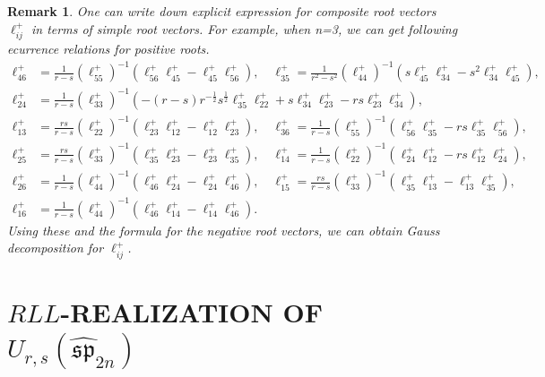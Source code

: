 \documentclass[10pt,a4paper]{amsart}
\newtheorem{remark}[theorem]{Remark}
\numberwithin{equation}{section}
\begin{document}
  \begin{remark} One can write down explicit expression for composite root vectors $\ell_{i j}^{+}$ in terms of simple root vectors.
  For example, when n=3, we can get  following ecurrence relations for positive roots.
\begin{align*}
\ell_{46}^{+}&=\frac{1}{r-s}\left(\ell_{55}^{+}\right)^{-1}\left(\ell_{56}^{+} \ell_{45}^{+}-\ell_{45}^{+} \ell_{56}^{+}\right), \quad \ell_{35}^{+}=\frac{1}{r^2-s^2}\left(\ell_{44}^{+}\right)^{-1}\left(s \ell_{45}^{+} \ell_{34}^{+}-s^2 \ell_{34}^{+} \ell_{45}^{+}\right),\\
\ell_{24}^{+}&=\frac{1}{r-s}\left(\ell_{33}^{+}\right)^{-1}\left(-(r-s) r^{-\frac{1}{2}} s^{\frac{1}{2}} \ell_{35}^{+} \ell_{22}^{+}+s \ell_{34}^{+} \ell_{23}^{+}-r s \ell_{23}^{+} \ell_{34}^{+}\right), \\
\ell_{13}^{+}&=\frac{r s}{r-s}\left(\ell_{22}^{+}\right)^{-1}\left(\ell_{23}^{+} \ell_{12}^{+}-\ell_{12}^{+} \ell_{23}^{+}\right), \quad \ell_{36}^{+}=\frac{1}{r-s}\left(\ell_{55}^{+}\right)^{-1}\left(\ell_{56}^{+} \ell_{35}^{+}-r s \ell_{35}^{+} \ell_{56}^{+}\right),\\
\ell_{25}^{+}&=\frac{r s}{r-s}\left(\ell_{33}^{+}\right)^{-1}\left(\ell_{35}^{+} \ell_{23}^{+}-\ell_{23}^{+} \ell_{35}^{+}\right), \quad \ell_{14}^{+}=\frac{1}{r-s}\left(\ell_{22}^{+}\right)^{-1}\left(\ell_{24}^{+} \ell_{12}^{+}-r s \ell_{12}^{+} \ell_{24}^{+}\right),\\
\ell_{26}^{+}&=\frac{1}{r-s}\left(\ell_{44}^{+}\right)^{-1}\left(\ell_{46}^{+} \ell_{24}^{+}-\ell_{24}^{+} \ell_{46}^{+}\right), \quad \ell_{15}^{+}=\frac{r s}{r-s}\left(\ell_{33}^{+}\right)^{-1}\left(\ell_{35}^{+} \ell_{13}^{+}-\ell_{13}^{+} \ell_{35}^{+}\right),\\
\ell_{16}^{+}&=\frac{1}{r-s}\left(\ell_{44}^{+}\right)^{-1}\left(\ell_{46}^{+} \ell_{14}^{+}-\ell_{14}^{+} \ell_{46}^{+}\right).
\end{align*}
Using these and the formula for the negative root vectors, we can obtain Gauss decomposition for $\ell_{i j}^{+}$.

  	\end{remark}

	\section{$RLL$-REALIZATION OF $U_{r, s}(\widehat{\mathfrak{sp}}_{2n})$}
\end{document}
